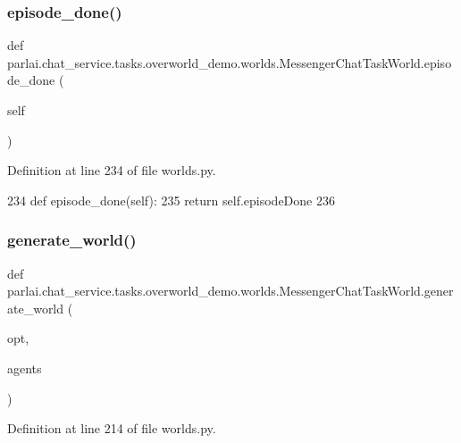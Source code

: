 \subsubsection{\texorpdfstring{episode\+\_\+done()}{episode\_done()}}
{\footnotesize\ttfamily def parlai.\+chat\+\_\+service.\+tasks.\+overworld\+\_\+demo.\+worlds.\+Messenger\+Chat\+Task\+World.\+episode\+\_\+done (\begin{DoxyParamCaption}\item[{}]{self }\end{DoxyParamCaption})}



Definition at line 234 of file worlds.\+py.


\begin{DoxyCode}
234     \textcolor{keyword}{def }episode\_done(self):
235         \textcolor{keywordflow}{return} self.episodeDone
236 
\end{DoxyCode}
\mbox{\label{classparlai_1_1chat__service_1_1tasks_1_1overworld__demo_1_1worlds_1_1MessengerChatTaskWorld_a1c448c458108763a93921eab8c155cb6}} 
\subsubsection{\texorpdfstring{generate\+\_\+world()}{generate\_world()}}
{\footnotesize\ttfamily def parlai.\+chat\+\_\+service.\+tasks.\+overworld\+\_\+demo.\+worlds.\+Messenger\+Chat\+Task\+World.\+generate\+\_\+world (\begin{DoxyParamCaption}\item[{}]{opt,  }\item[{}]{agents }\end{DoxyParamCaption})\hspace{0.3cm}{\ttfamily [static]}}



Definition at line 214 of file worlds.\+py.


